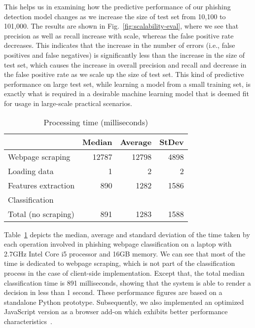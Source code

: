 \documentclass[10pt,conference,compsocconf,letterpaper]{IEEEtran}
\begin{document}
\iffullversion
This helps us in examining how the predictive performance of our phishing detection model changes as we increase the size of test set from 10,100 to 101,000. 
\fi
The results are shown in Fig.~\ref{fig:scalability-eval}, where we see that precision as well as recall increase with scale, whereas the false positive rate decreases. This indicates that the increase in the number of errors (i.e., false positives and false negatives) is significantly less than the increase in the size of test set, which causes the increase in overall precision and recall and decrease in the false positive rate as we scale up the size of test set. This kind of predictive performance on large test set, while learning a model from a small training set,  is exactly what is required in a desirable machine learning model that is deemed fit for usage in large-scale practical scenarios. 

\begin{table}[tbh]
\centering
\begin{tabular}{l r r r}

 & \textbf{Median} & \textbf{Average} & \textbf{StDev} \\ \hline
Webpage scraping & 12787 & 12798 & 4898 \\
Loading data & 1 & 2 & 2 \\ 
Features extraction & 890 & 1282 & 1586 \\ 
Classification &  &  &  \\ \hline
Total (no scraping) & 891 & 1283 & 1588

\end{tabular}
\caption{Processing time (milliseconds)}
\label{tab:time}
\end{table}

Table~\ref{tab:time} depicts the median, average and standard deviation of the time taken by each operation involved in phishing webpage classification on a laptop with 2.7GHz Intel Core i5 processor and 16GB memory. We can see that most of the time is dedicated to webpage scraping, which is not part of the classification process in the case of client-side implementation. Except that, the total median classification time is 891 milliseconds, showing that the system is able to render a decision in less than 1 second. These performance figures are based on a standalone Python prototype. Subsequently, we also implemented an optimized JavaScript version as a browser add-on which exhibits better performance characteristics~\cite{armano:2016:real}.
\end{document}
